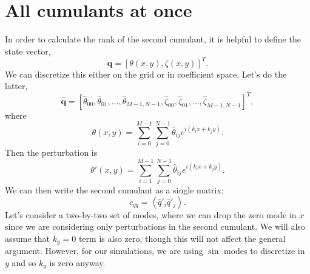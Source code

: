 \documentclass[11pt]{article}
\newcommand{\htt}{\hat{\theta}}
\newcommand{\htz}{\hat{\zeta}}
\begin{document}
\section{All cumulants at once}
\label{sec:all_c}
In order to calculate the rank of the second cumulant, it is helpful to define the state vector,
\begin{equation}
  \label{eq:state_vec}
  \mathbf{q} = \left[\theta(x, y), \zeta(x,y)\right]^T.
\end{equation}
We can discretize this either on the grid or in coefficient space.
Let's do the latter,
\begin{equation}
  \label{eq:state_vec_discr}
  \mathbf{\hat{q}} = \left[\htt_{00}, \htt_{01}, \ldots, \htt_{M-1,N-1}, \htz_{00}, \htz_{01}, \ldots, \htz_{M-1,N-1}\right]^T,
\end{equation}
where
\begin{equation}
  \label{eq:coefficent_def}
  \theta(x, y) = \sum_{i=0}^{M-1} \sum_{j=0}^{N-1} \htt_{ij} e^{i (k_i x + k_j y)}.
\end{equation}
Then the perturbation is
\begin{equation}
  \label{eq:perturbcoefficent_def}
  \theta'(x, y) = \sum_{i = 1}^{M-1} \sum_{j=0}^{N-1} \htt_{ij} e^{i (k_i x + k_j y)}.
\end{equation}
We can then write the second cumulant as a single matrix:
\begin{equation}
  \label{eq:second_c_state_vec}
  c_{q q} = \left< \hat{q}'_i \hat{q}'_j \right>.
\end{equation}
Let's consider a two-by-two set of modes, where we can drop the zero mode in $x$ since we are considering only perturbations in the second cumulant.
We will also assume that $k_y = 0$ term is also zero, though this will not affect the general argument.
However, for our simulations, we are using $\sin$ modes to discretize in $y$ and so $k_y$ is zero anyway.
\end{document}
